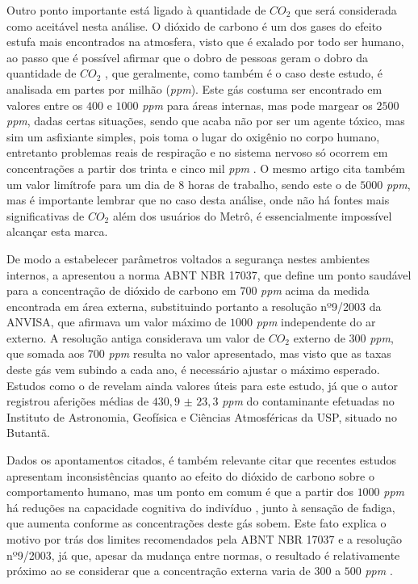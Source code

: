 \documentclass[acronym,symbols,table]{fei}
\begin{document}
Outro ponto importante está ligado à quantidade de ${CO}_{2}$ que será considerada como aceitável nesta análise. O dióxido de carbono é um dos gases do efeito estufa mais encontrados na atmosfera, visto que é exalado por todo ser humano, ao passo que é possível afirmar que o dobro de pessoas geram o dobro da quantidade de ${CO}_{2}$ \cite{ashrae2001}, que geralmente, como também é o caso deste estudo, é analisada em partes por milhão (\textit{ppm}). Este gás costuma ser encontrado em valores entre os $400$ e $1000$ \textit{ppm} para áreas internas, mas pode margear os $2500$ \textit{ppm}, dadas certas situações, sendo que acaba não por ser um agente tóxico, mas sim um asfixiante simples, pois toma o lugar do oxigênio no corpo humano, entretanto problemas reais de respiração e no sistema nervoso só ocorrem em concentrações a partir dos trinta e cinco mil \textit{ppm} \cite{handbook2017ashrae}. O mesmo artigo cita também um valor limítrofe para um dia de 8 horas de trabalho, sendo este o de $5000$ \textit{ppm}, mas é importante lembrar que no caso desta análise, onde não há fontes mais significativas de ${CO}_{2}$ além dos usuários do Metrô, é essencialmente impossível alcançar esta marca.

De modo a estabelecer parâmetros voltados a segurança nestes ambientes internos, a \textcite{abnt17037} apresentou a norma ABNT NBR 17037, que define um ponto saudável para a concentração de dióxido de carbono em $700$ \textit{ppm} acima da medida encontrada em área externa, substituindo portanto a resolução nº9/2003 da ANVISA, que afirmava um valor máximo de $1000$ \textit{ppm} independente do ar externo. A resolução antiga considerava um valor de ${CO}_{2}$ externo de $300$ \textit{ppm}, que somada aos $700$ \textit{ppm} resulta no valor apresentado, mas visto que as taxas deste gás vem subindo a cada ano, é necessário ajustar o máximo esperado. Estudos como o de \textcite{stoco} revelam ainda valores úteis para este estudo, já que o autor registrou aferições médias de $430,9$ $\pm$ $23,3$ \textit{ppm} do contaminante efetuadas no Instituto de Astronomia, Geofísica e Ciências Atmosféricas da USP, situado no Butantã.

Dados os apontamentos citados, é também relevante citar que recentes estudos apresentam inconsistências quanto ao efeito do dióxido de carbono sobre o comportamento humano, mas um ponto em comum é que a partir dos $1000$ \textit{ppm} há reduções na capacidade cognitiva do indivíduo \cite{astmD6245}, junto à sensação de fadiga, que aumenta conforme as concentrações deste gás sobem. Este fato explica o motivo por trás dos limites recomendados pela ABNT NBR 17037 e a resolução nº9/2003, já que, apesar da mudança entre normas, o resultado é relativamente próximo ao se considerar que a concentração externa varia de $300$ a $500$ \textit{ppm} \cite{ashrae2016}. %
\end{document}
